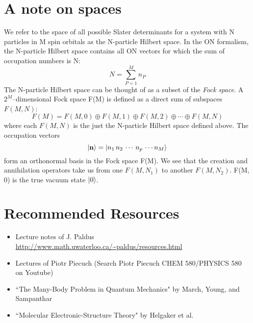 \documentclass{article}
\def\*#1{\mathbf{#1}}
\begin{document}
\section{A note on spaces}
We refer to the space of all possible Slater determinants for a system with N particles in M spin orbitals as the N-particle Hilbert space.
In the ON formalism, the N-particle Hilbert space contains all ON vectors for which the sum of occupation numbers is N:
\[ N = \sum_{P = 1}^M n_P \]
The N-particle Hilbert space can be thought of as a subset of the \textit{Fock space}. 
 A $2^M$--dimensional Fock space F(M) is defined as a direct sum of subspaces $F(M, N)$:
 \[F(M) = F(M, 0 ) \oplus  F(M, 1 )  \oplus   F(M, 2 )  \oplus \cdots \oplus F(M, N) \]
where each $F(M, N)$ is the just the N-particle Hilbert space defined above. 
The occupation vectors 
\[\ket{\*{n}} = \ket{n_1 \, n_2 \, \cdots \,  n_p \, \cdots n_M}\] 
form an orthonormal basis in the Fock space F(M). 
We see that the creation and annihilation operators take us from one $F(M, N_1)$ to another $F(M, N_2)$.
F(M, 0) is the true vacuum state $\ket{0}$. 

\section{Recommended Resources}
\begin{itemize}
\item Lecture notes of J. Paldus \url{http://www.math.uwaterloo.ca/~paldus/resources.html}
\item Lectures of Piotr Piecuch (Search Piotr Piecuch CHEM 580/PHYSICS 580 on Youtube)
\item ``The Many-Body Problem in Quantum Mechanics" by March, Young, and Sampanthar
\item ``Molecular Electronic-Structure Theory" by Helgaker et al.
\end{itemize}
\end{document}
